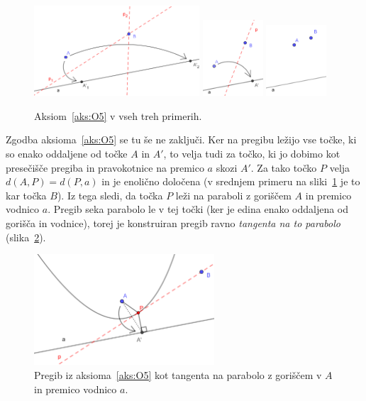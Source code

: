\begin{figure}[h!]
    \centering
    \includegraphics[width=0.55\textwidth]{images/origami_aksiomi/O5a.png}
    \includegraphics[width=0.2\textwidth]{images/origami_aksiomi/O5b.png}
    \includegraphics[width=0.2\textwidth]{images/origami_aksiomi/O5c.png}
    \caption[Aksiom~\ref{aks:O5}]{Aksiom~\ref{aks:O5} v vseh treh primerih.}
    \label{fig:O5}
\end{figure}

Zgodba aksioma~\ref{aks:O5} se tu še ne zaključi. Ker na pregibu ležijo vse točke, ki so enako oddaljene od točke $A$ in $A'$, to velja tudi za točko, ki jo dobimo kot presečišče pregiba in pravokotnice na premico $a$ skozi $A'$. Za tako točko $P$ velja $ d(A,P) = d(P,a) $ in je enolično določena (v srednjem primeru na sliki~\ref{fig:O5} je to kar točka $B$). Iz tega sledi, da točka $P$ leži na paraboli z goriščem $A$ in premico vodnico $a$. Pregib seka parabolo le v tej točki (ker je edina enako oddaljena od gorišča in vodnice), torej je konstruiran pregib ravno \emph{tangenta na to parabolo} (slika~\ref{fig:O5_parabola}).

\begin{figure}[h!]
    \centering
    \includegraphics[width=0.6\textwidth]{images/origami_aksiomi/O5_parabola.png}
    \caption[Tangenta na parabolo]{Pregib iz aksioma~\ref{aks:O5} kot tangenta na parabolo z goriščem v $A$ in premico vodnico $a$.}
    \label{fig:O5_parabola}
\end{figure}

